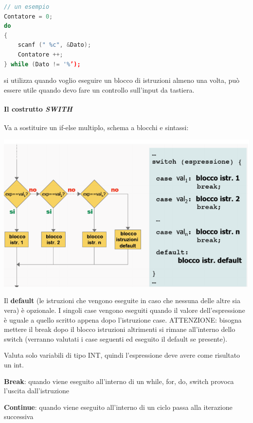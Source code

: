 \documentclass[
  paper=a4,
  oneside  ,captions=tableheading
]{scrbook}
\begin{document}
\begin{lstlisting}[language={C++}]
// un esempio
Contatore = 0;
do
{
    scanf (" %c", &Dato);
    Contatore ++;
} while (Dato != '%’);
\end{lstlisting}

si utilizza quando voglio eseguire un blocco di istruzioni almeno una
volta, può essere utile quando devo fare un controllo sull'input da
tastiera.

\hypertarget{il-costrutto-swith}{%
\paragraph{\texorpdfstring{Il costrutto
\emph{SWITH}}{Il costrutto SWITH}}\label{il-costrutto-swith}}

Va a sostituire un if-else multiplo, schema a blocchi e sintassi:

\includegraphics{./image/image-20201207224317378.png}

Il \textbf{default} (le istruzioni che vengono eseguite in caso che
nessuna delle altre sia vera) è opzionale. I singoli case vengono
eseguiti quando il valore dell'espressione è uguale a quello scritto
appena dopo l'istruzione case. ATTENZIONE: bisogna mettere il break dopo
il blocco istruzioni altrimenti si rimane all'interno dello switch
(verranno valutati i case seguenti ed eseguito il default se presente).

Valuta solo variabili di tipo INT, quindi l'espressione deve avere come
risultato un int.

\textbf{Break}: quando viene eseguito all'interno di un while, for, do,
switch provoca l'uscita dall'istruzione

\textbf{Continue}: quando viene eseguito all'interno di un ciclo passa
alla iterazione successiva
\end{document}

